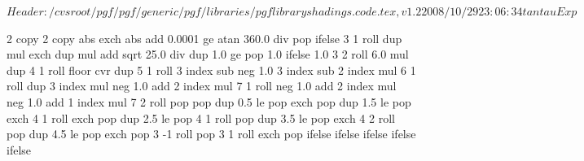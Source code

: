 %
%
%

\ProvidesFileRCS[v\pgfversion] $Header: /cvsroot/pgf/pgf/generic/pgf/libraries/pgflibraryshadings.code.tex,v 1.2 2008/10/29 23:06:34 tantau Exp $


%
%

{\pgfpoint{-50bp}{-50bp}}
{\pgfpoint{50bp}{50bp}}
{}
{ %
  2 copy %
  2 copy abs exch abs add 0.0001 ge 
  {atan 360.0 div} %
  { pop } %
  ifelse  %
  3 1 roll %
  dup mul %
  exch dup mul %
  add sqrt %
  25.0 div %
  dup 1.0 ge %
  { pop 1.0 }{} ifelse %
  1.0 %
  3 2 roll 6.0 mul dup 4 1 roll %
  floor cvr  %
  dup 5 1 roll %
  3 index sub neg %
  1.0 3 index sub %
  2 index mul %
  6 1 roll %
  dup 3 index mul neg 1.0 add %
  2 index mul %
  7 1 roll %
  neg 1.0 add %
  2 index mul neg 1.0  add %
  1 index mul %
  7 2 roll %
  pop pop %
  dup 0.5 le %
  { %
    pop exch pop
  }
  { dup 1.5 le %
    { %
      pop exch 4 1 roll exch pop
    }
    { dup 2.5 le %
      { %
        pop 4 1 roll pop
      }
      { dup 3.5 le %
        { %
          pop exch 4 2 roll pop
        }
        { dup 4.5 le %
          { %
            pop exch pop 3 -1 roll
          }
          { %
            pop 3 1 roll exch pop
          }
          ifelse
        }
        ifelse %
      }
      ifelse %
    }
    ifelse %
  }
  ifelse %
}

